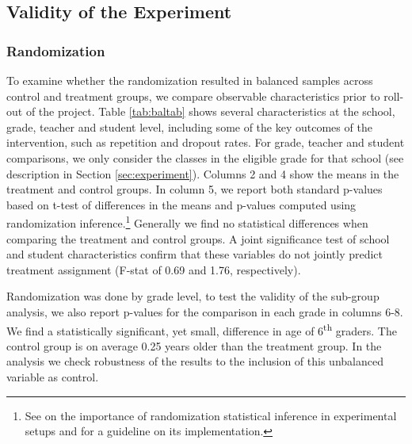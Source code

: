 \documentclass[11pt,a4paper]{article}
\begin{document}
\subsection{Validity of the Experiment} \label{sec:balance}

\subsubsection*{Randomization}
To examine whether the randomization resulted in balanced samples across control and treatment groups, we compare observable characteristics prior to roll-out of the project. Table \ref{tab:baltab} shows several characteristics at the school, grade, teacher and student level, including some of the key outcomes of the intervention, such as repetition and dropout rates. For grade, teacher and student comparisons, we only consider the classes in the eligible grade for that school (see description in Section \ref{sec:experiment}). Columns 2 and 4 show the means in the treatment and control groups. In column 5, we report both standard p-values based on t-test of differences in the means and p-values computed using randomization inference.\footnote{See \cite{young2019channelling} on the importance of randomization statistical inference in experimental setups and \cite{hess2017randomization} for a guideline on its implementation.} Generally we find no statistical differences when comparing the treatment and control groups. A joint significance test of school and student characteristics confirm that these variables do not jointly predict treatment assignment (F-stat of 0.69 and 1.76, respectively).

Randomization was done by grade level, to test the validity of the sub-group analysis, we also report p-values for the comparison in each grade in columns 6-8. We find a statistically significant, yet small, difference in age of 6\textsuperscript{th} graders. The control group is on average 0.25 years older than the treatment group. In the analysis we check robustness of the results to the inclusion of this unbalanced variable as control.
\end{document}
